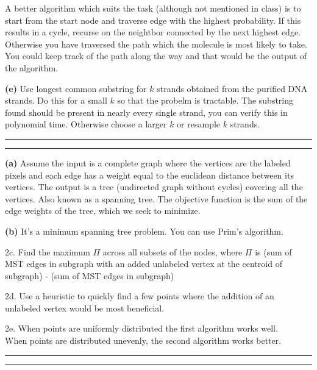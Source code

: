 \documentclass[11pt,letterpaper]{article}
\newcommand{\question}[1] {\vspace{.25in} \hrule\vspace{0.5em}
\noindent{\bf #1} \vspace{0.5em}
\hrule \vspace{.10in}}
\renewcommand{\part}[1] {\vspace{.10in} {\bf (#1)}}
\begin{document}
A better algorithm which suits the task (although not mentioned in class) is to start from the start node and traverse edge with the highest probability. If this results in a cycle, recurse on the neightbor connected by the next highest edge.
Otherwise you have traversed the path which the molecule is most likely to take. You could keep track of the path along the way and that would be the output of the algorithm.

\part{e}
Use longest common substring for $k$ strands obtained from the purified DNA strands. Do this for a small $k$ so that the probelm is tractable.
The substring found should be present in nearly every single strand, you can verify this in polynomial time. Otherwise choose a larger $k$ or resample $k$ strands.


\question{2}
\part{a}
Assume the input is a complete graph where the vertices are the labeled pixels and each edge has a weight equal to the euclidean distance between its vertices.
The output is a tree (undirected graph without cycles) covering all the vertices. Also known as a spanning tree.
The objective function is the sum of the edge weights of the tree, which we seek to minimize.

\part{b}
It's a minimum spanning tree problem. You can use Prim's algorithm.

2c.
Find the maximum $\Pi$ across all subsets of the nodes, where $\Pi$ is (sum of MST edges in subgraph with an added unlabeled vertex at the centroid of subgraph) - (sum of MST edges in subgraph)

2d.
Use a heuristic to quickly find a few points where the addition of an unlabeled vertex would be most beneficial.

2e.
When points are uniformly distributed the first algorithm works well.\\
When points are distributed unevenly, the second algorithm works better.


\question{3}
\end{document}
